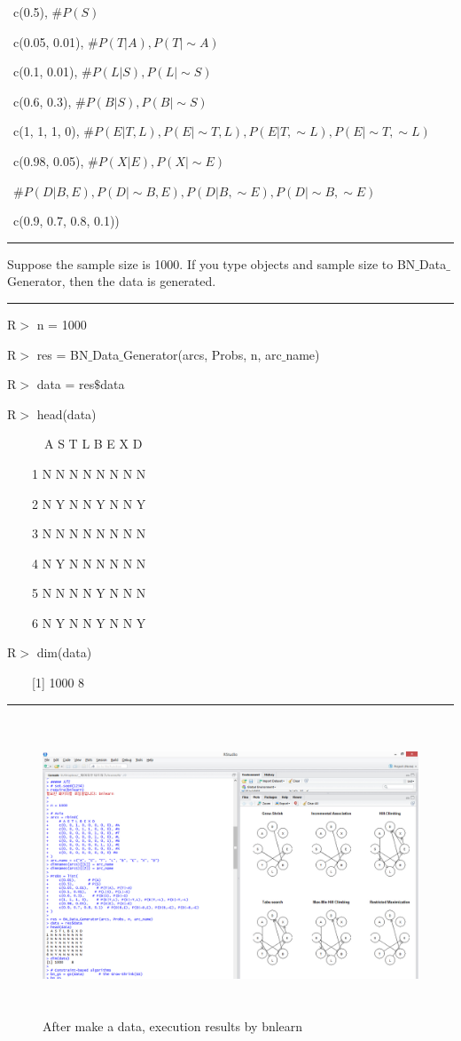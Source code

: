 	~c(0.5), 						$\# P(S)$
	
	~c(0.05, 0.01),				$\# P(T|A), P(T|\sim A)$
	
	~c(0.1, 0.01),				$\# P(L|S), P(L|\sim S)$
	
	~c(0.6, 0.3),					$\# P(B|S), P(B|\sim S)$
	
	~c(1, 1, 1, 0),				$\# P(E|T,L), P(E|\sim T,L), P(E|T,\sim L), P(E|\sim T,\sim L)$
	
	~c(0.98, 0.05),				$\# P(X|E), P(X|\sim E)$

	~$\# P(D|B,E), P(D|\sim B,E), P(D|B,\sim E), P(D|\sim B,\sim E)$
	
	~c(0.9, 0.7, 0.8, 0.1))

\begin{center}\rule[0.5ex]{0.9\columnwidth}{1pt}\end{center}

Suppose the sample size is 1000. If you type objects and sample size to BN$\_$Data$\_$Generator, then the data is generated.

\begin{center}\rule[0.5ex]{0.9\columnwidth}{1pt}\end{center}

R$>$ n = 1000
 
R$>$ res = BN$\_$Data$\_$Generator(arcs, Probs, n, arc$\_$name)

R$>$ data = res$\$$data

R$>$ head(data)

~~~~~~A S T L B E X D
  
~~~~1 N N N N N N N N

~~~~2 N Y N N Y N N Y

~~~~3 N N N N N N N N

~~~~4 N Y N N N N N N

~~~~5 N N N N Y N N N

~~~~6 N Y N N Y N N Y

R$>$ dim(data)

~~~~[1] 1000    8

\begin{center}\rule[0.5ex]{0.9\columnwidth}{1pt}\end{center}

\begin{figure}[h]
	\centering
	\includegraphics[height=250pt]{image23}
	\caption{After make a data, execution results by bnlearn}
\end{figure}